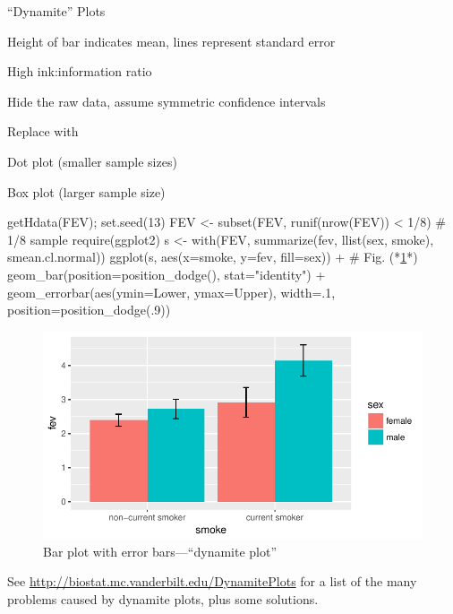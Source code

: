 \bi
\item ``Dynamite'' Plots
\item Height of bar indicates mean, lines represent standard error
\item High ink:information ratio
\item Hide the raw data, assume symmetric confidence intervals
\item Replace with
  \bi
   \item Dot plot (smaller sample sizes)
   \item Box plot (larger sample size)
  \ei
\ei
\begin{Schunk}
\begin{Sinput}
getHdata(FEV); set.seed(13)   
FEV <- subset(FEV, runif(nrow(FEV)) < 1/8)   # 1/8 sample
require(ggplot2)
s <- with(FEV, summarize(fev, llist(sex, smoke), smean.cl.normal))
ggplot(s, aes(x=smoke, y=fev, fill=sex)) +    # Fig. (*\ref{fig:descript-dynamite}*)
    geom_bar(position=position_dodge(), stat="identity") +
    geom_errorbar(aes(ymin=Lower, ymax=Upper),
                  width=.1,
                  position=position_dodge(.9))
\end{Sinput}
\begin{figure}[htbp]

\centerline{\includegraphics[width=\maxwidth]{descript-dynamite-1} }

\caption[Bar plot with error bars---``dynamite plot'']{Bar plot with error bars---``dynamite plot''}\label{fig:descript-dynamite}
\end{figure}
\end{Schunk}
See \url{http://biostat.mc.vanderbilt.edu/DynamitePlots} for a list of
the many problems caused by dynamite plots, plus some solutions.

